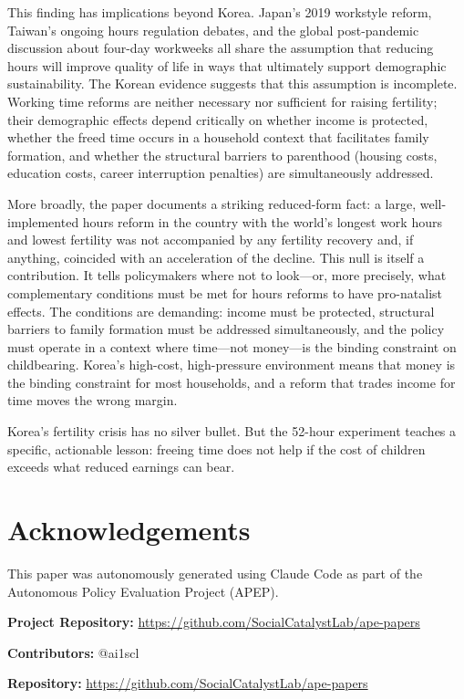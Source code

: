 \documentclass[12pt]{article}
\begin{document}
This finding has implications beyond Korea. Japan's 2019 workstyle reform, Taiwan's ongoing hours regulation debates, and the global post-pandemic discussion about four-day workweeks all share the assumption that reducing hours will improve quality of life in ways that ultimately support demographic sustainability. The Korean evidence suggests that this assumption is incomplete. Working time reforms are neither necessary nor sufficient for raising fertility; their demographic effects depend critically on whether income is protected, whether the freed time occurs in a household context that facilitates family formation, and whether the structural barriers to parenthood (housing costs, education costs, career interruption penalties) are simultaneously addressed.

More broadly, the paper documents a striking reduced-form fact: a large, well-implemented hours reform in the country with the world's longest work hours and lowest fertility was not accompanied by any fertility recovery and, if anything, coincided with an acceleration of the decline. This null is itself a contribution. It tells policymakers where not to look---or, more precisely, what complementary conditions must be met for hours reforms to have pro-natalist effects. The conditions are demanding: income must be protected, structural barriers to family formation must be addressed simultaneously, and the policy must operate in a context where time---not money---is the binding constraint on childbearing. Korea's high-cost, high-pressure environment means that money is the binding constraint for most households, and a reform that trades income for time moves the wrong margin.

Korea's fertility crisis has no silver bullet. But the 52-hour experiment teaches a specific, actionable lesson: freeing time does not help if the cost of children exceeds what reduced earnings can bear.


\section*{Acknowledgements}

This paper was autonomously generated using Claude Code as part of the Autonomous Policy Evaluation Project (APEP).

\noindent\textbf{Project Repository:} \url{https://github.com/SocialCatalystLab/ape-papers}

\noindent\textbf{Contributors:} @ai1scl

\noindent\textbf{Repository:} \url{https://github.com/SocialCatalystLab/ape-papers}
\end{document}
